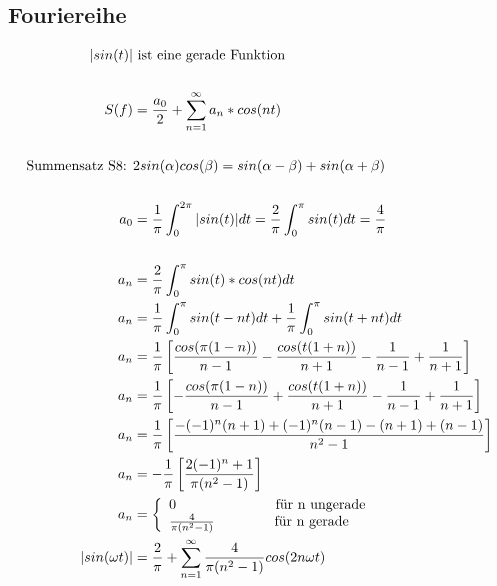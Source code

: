 \subsection{Fouriereihe}
\begin{center}
  \begin{align*}
    |sin(t)| & \text{ ist eine gerade Funktion} \\ \\
    S(f) &= \frac{a_0}{2} + \sum_{n=1}^{\infty} a_n * cos(nt) \\ \\
    \text{Summensatz S8: } & 2sin(\alpha)cos(\beta) = sin(\alpha-\beta)+sin(\alpha+\beta) \\ \\
    a_0 &= \frac{1}{\pi}\int_0^{2\pi} |sin(t)| dt = \frac{2}{\pi}\int_0^{\pi} sin(t) dt = \frac{4}{\pi} \\ \\
    a_n &= \frac{2}{\pi}\int_0^{\pi} sin(t) * cos (nt) dt \\
    a_n &= \frac{1}{\pi}\int_0^{\pi} sin(t - nt) dt +  \frac{1}{\pi}\int_0^{\pi} sin(t + nt) dt\\
    a_n &= \frac{1}{\pi} \left[ \frac{cos(\pi(1-n))}{n-1} - \frac{cos(t(1+n))}{n+1} - \frac{1}{n-1} + \frac{1}{n+1} \right] \\
    a_n &= \frac{1}{\pi} \left[ -\frac{cos(\pi(1-n))}{n-1} + \frac{cos(t(1+n))}{n+1} - \frac{1}{n-1} + \frac{1}{n+1} \right] \\
    a_n &= \frac{1}{\pi} \left[ \frac{-(-1)^n (n+1) + (-1)^n (n-1) - (n+1) + (n-1)}{n^2-1} \right] \\
    a_n &= -\frac{1}{\pi} \left[ \frac{2(-1)^n + 1}{\pi(n^2-1)} \right] \\
    a_n &= \left\{\begin{array}{ll}
            0                     \hspace{2.5cm} \text{f\"ur n ungerade}\\
            \frac{4}{\pi(n^2-1)} \hspace{1.5cm} \text{f\"ur n gerade}
            \end{array}\right. \\
    |sin(\omega t)| &= \frac{2}{\pi} + \sum_{n=1}^{\infty}\frac{4}{\pi(n^2-1)} cos(2n\omega t)
  \end{align*}
\end{center}

